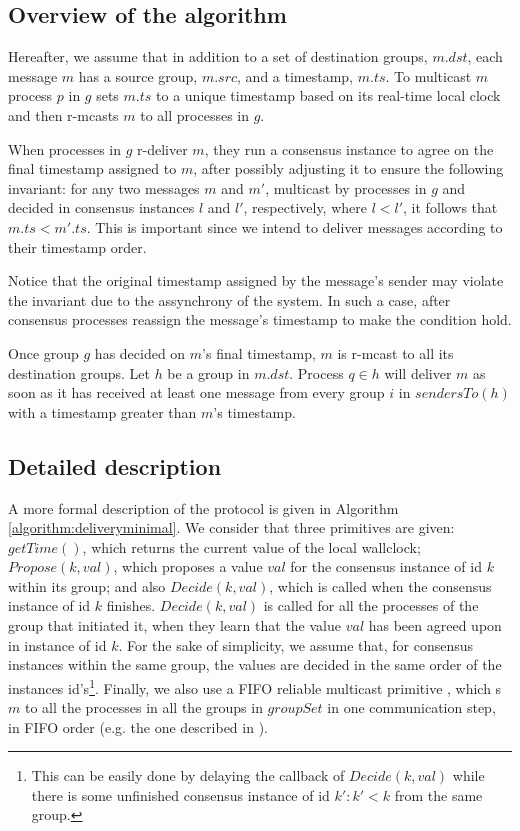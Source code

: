 \documentclass[times, 10pt]{article}
\begin{document}
\subsection{Overview of the algorithm}

Hereafter, we assume that in addition to a set of destination groups, $m.dst$, each message $m$ has a source group, $m.src$, and a timestamp, $m.ts$. To multicast $m$ process $p$ in $g$ sets $m.ts$ to a unique timestamp based on its real-time local clock and then r-mcasts $m$ to all processes in $g$.

When processes in $g$ r-deliver $m$, they run a consensus instance to agree on the final timestamp assigned to $m$, after possibly adjusting it to ensure the following invariant: for any two messages $m$ and $m'$, multicast by processes in $g$ and decided in consensus instances $l$ and $l'$, respectively, where $l < l'$, it follows that $m.ts < m'.ts$. This is important since we intend to deliver messages according to their timestamp order.

Notice that the original timestamp assigned by the message's sender may violate the invariant due to the assynchrony of the system. In such a case, after consensus processes reassign the message's timestamp to make the condition hold.

Once group $g$ has decided on $m$'s final timestamp, $m$ is r-mcast to all its destination groups. Let $h$ be a group in $m.dst$. Process $q \in h$ will deliver $m$ as soon as it has received at least one message from every group $i$ in $sendersTo(h)$ with a timestamp greater than $m$'s timestamp.


\subsection{Detailed description}

A more formal description of the protocol is given in Algorithm \ref{algorithm:deliveryminimal}. We consider that three primitives are given: $getTime()$, which returns the current value of the local wallclock; $Propose(k, val)$, which proposes a value $val$ for the consensus instance of id $k$ within its group; and also $Decide(k, val)$, which is called when the consensus instance of id $k$ finishes. $Decide(k, val)$ is called for all the processes of the group that initiated it, when they learn that the value $val$ has been agreed upon in instance of id $k$. For the sake of simplicity, we assume that, for consensus instances within the same group, the values are decided in the same order of the instances id's\footnote{This can be easily done by delaying the callback of $Decide(k, val)$ while there is some unfinished consensus instance of id $k': k' < k$ from the same group.}. Finally, we also use a FIFO reliable multicast primitive , which \rmdel{}s $m$ to all the processes in all the groups in $groupSet$ in one communication step, in FIFO order (e.g. the one described in \cite{ufrmcast1delta}).
\end{document}
